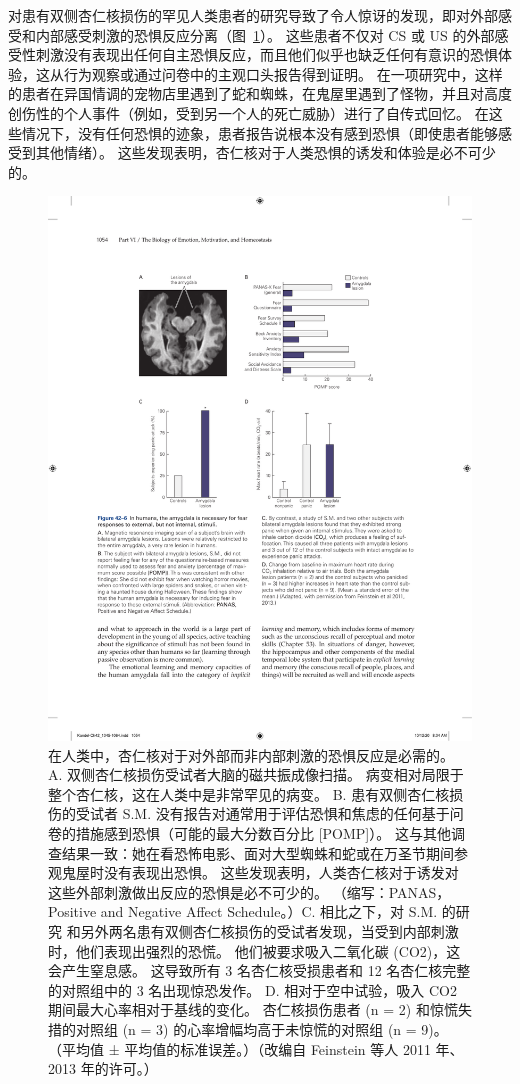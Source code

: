 对患有双侧杏仁核损伤的罕见人类患者的研究导致了令人惊讶的发现，即对外部感受和内部感受刺激的恐惧反应分离（图~\ref{fig:42_6}）。
这些患者不仅对 CS 或 US 的外部感受性刺激没有表现出任何自主恐惧反应，而且他们似乎也缺乏任何有意识的恐惧体验，这从行为观察或通过问卷中的主观口头报告得到证明。
在一项研究中，这样的患者在异国情调的宠物店里遇到了蛇和蜘蛛，在鬼屋里遇到了怪物，并且对高度创伤性的个人事件（例如，受到另一个人的死亡威胁）进行了自传式回忆。
在这些情况下，没有任何恐惧的迹象，患者报告说根本没有感到恐惧（即使患者能够感受到其他情绪）。
这些发现表明，杏仁核对于人类恐惧的诱发和体验是必不可少的。


\begin{figure}[htbp]
	\centering
	\includegraphics[width=0.7\linewidth]{chap42/fig_42_6}
	\caption{在人类中，杏仁核对于对外部而非内部刺激的恐惧反应是必需的。 A. 双侧杏仁核损伤受试者大脑的磁共振成像扫描。 病变相对局限于整个杏仁核，这在人类中是非常罕见的病变。 B. 患有双侧杏仁核损伤的受试者 S.M. 没有报告对通常用于评估恐惧和焦虑的任何基于问卷的措施感到恐惧（可能的最大分数百分比 [POMP]）。 这与其他调查结果一致：她在看恐怖电影、面对大型蜘蛛和蛇或在万圣节期间参观鬼屋时没有表现出恐惧。 这些发现表明，人类杏仁核对于诱发对这些外部刺激做出反应的恐惧是必不可少的。 （缩写：PANAS，Positive and Negative Affect Schedule。）C. 相比之下，对 S.M. 的研究 和另外两名患有双侧杏仁核损伤的受试者发现，当受到内部刺激时，他们表现出强烈的恐慌。 他们被要求吸入二氧化碳 (CO2)，这会产生窒息感。 这导致所有 3 名杏仁核受损患者和 12 名杏仁核完整的对照组中的 3 名出现惊恐发作。 D. 相对于空中试验，吸入 CO2 期间最大心率相对于基线的变化。 杏仁核损伤患者 (n = 2) 和惊慌失措的对照组 (n = 3) 的心率增幅均高于未惊慌的对照组 (n = 9)。 （平均值 ± 平均值的标准误差。）（改编自 Feinstein 等人 2011 年、2013 年的许可。）}
	\label{fig:42_6}
\end{figure}


